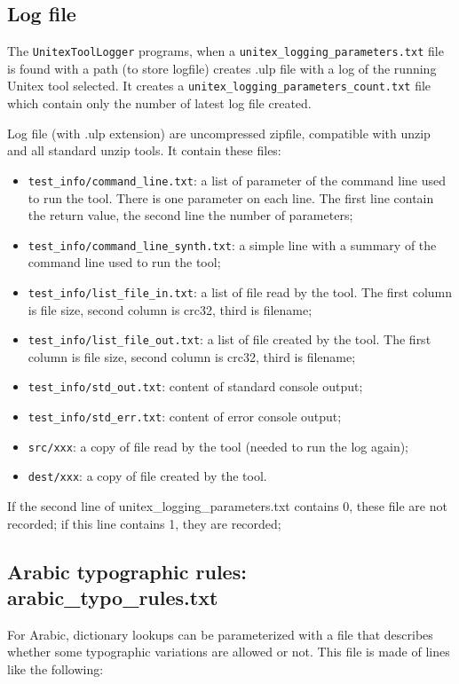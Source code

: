\subsection{Log file}
 \label{section-log-file}
The \verb+UnitexToolLogger+ programs, when a \verb+unitex_logging_parameters.txt+ file
is found with a path (to store logfile) creates .ulp file with a log of the running
Unitex tool selected.
It creates a \verb+unitex_logging_parameters_count.txt+ file which contain only the number
of latest log file created.

Log file (with .ulp extension) are uncompressed zipfile, compatible with unzip and
all standard unzip tools. It contain these files:
\begin{itemize}
  \item \verb+test_info/command_line.txt+: a list of parameter of the
command line used to run the tool. There is one parameter on each line. The first line
contain the return value, the second line the number of parameters;

  \item \verb+test_info/command_line_synth.txt+: a simple line with a summary of the
command line used to run the tool;

  \item \verb+test_info/list_file_in.txt+: a list of file read by the tool.
  The first column is file size, second column is crc32, third is filename;

  \item \verb+test_info/list_file_out.txt+: a list of file created by the tool.
  The first column is file size, second column is crc32, third is filename;

  \item \verb+test_info/std_out.txt+: content of standard console output;

  \item \verb+test_info/std_err.txt+: content of error console output;

  \item \verb+src/xxx+: a copy of file read by the tool (needed to run the log again);

  \item \verb+dest/xxx+: a copy of file created by the tool.
\end{itemize}

If the second line of unitex\_logging\_parameters.txt contains 0, these file are not recorded;
if this line contains 1, they are recorded;

\subsection{Arabic typographic rules: arabic\_typo\_rules.txt}
\label{subsection-arabic-typo-rules}
For Arabic, dictionary lookups can be parameterized with a file that describes whether some typographic 
variations are allowed or not. This file is made of lines like the following:

